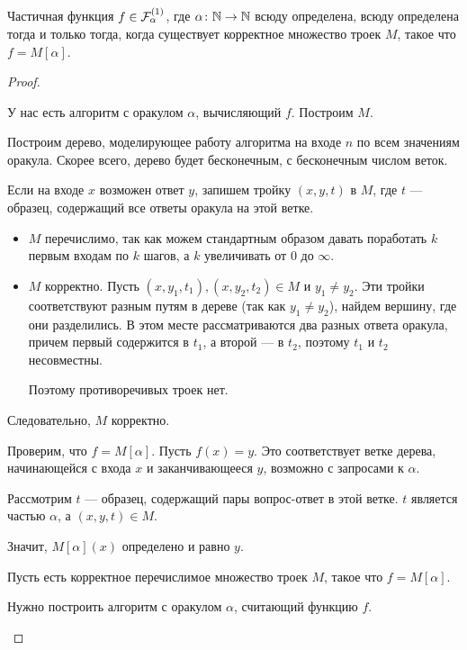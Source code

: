\begin{thm}\label{thm:malp}
	Частичная функция $ f \in \mathcal{F}^{(1)}_{ \alpha }$, где $ \alpha \colon \mathbb{N} \to  \mathbb{N}$ всюду определена, всюду определена тогда и только тогда, когда существует корректное множество троек $ M$, такое что  $ f = M[ \alpha ]$. 
\end{thm}
\begin{proof}
~\begin{description}
	\item[] У нас есть алгоритм с оракулом $  \alpha $, вычисляющий $ f$. Построим $ M$.

		   Построим  дерево, моделирующее работу алгоритма на входе $ n$ по всем значениям оракула. Скорее всего, дерево будет бесконечным, с бесконечным числом веток.

		   Если на входе $ x$ возможен ответ $ y$, запишем тройку  $ (x, y, t)$ в  $ M$, где  $ t$ --- образец, содержащий все  ответы оракула на этой ветке.
		   \begin{itemize}
			   \item $ M$ перечислимо, так как можем стандартным образом давать поработать $ k$ первым входам по $ k$ шагов, а $ k$ увеличивать от $ 0$ до  $  \infty$.
			   \item $ M$ корректно. Пусть  $ (x, y_1, t_1), (x, y_2, t_2) \in M$ и $  y_1 \ne y_2$. Эти тройки соответствуют разным путям в дереве (так как $  y_1 \ne y_2$), найдем вершину, где они разделились. В этом месте рассматриваются два разных ответа оракула, причем первый содержится в $  t_1$, а второй --- в $  t_2$, поэтому $  t_1$ и $  t_2$ несовместны.

				   Поэтому противоречивых троек нет.
		   \end{itemize}
		   Следовательно, $ M$ корректно.
	   \item Проверим, что $ f = M[ \alpha ]$. Пусть $ f(x) = y$. Это соответствует ветке дерева, начинающейся с входа $ x$ и заканчивающееся   $ y$, возможно с запросами к $  \alpha $.

		   Рассмотрим $ t$ --- образец, содержащий пары вопрос-ответ в этой ветке. $ t$ является частью  $ \alpha $, а $ (x, y, t) \in M$.

		   Значит, $ M[ \alpha ](x) $ определено и равно $ y$.
	   \item[\boxed{ 2 \Longrightarrow 1}] 
		   Пусть есть корректное перечислимое множество троек $ M$, такое  что $ f = M[ \alpha ]$.

		   Нужно построить алгоритм с оракулом $ \alpha $, считающий функцию $ f$.


\end{description}
\end{proof}
